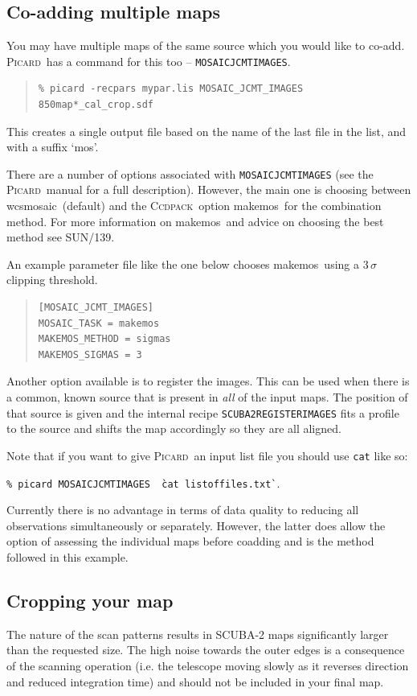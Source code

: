 \documentclass[twoside,11pt]{article}
\newcommand{\xref}[3]{#1}
\newcommand{\xlabel}[1]{}
\renewcommand{\_}{\texttt{\symbol{95}}}
\newenvironment{myquote}{\begin{quote}\begin{small}}{\end{small}\end{quote}}
\newcommand{\ccdpack}{\xref{\textsc{Ccdpack}}{sun139}{}}
\newcommand{\picard}{\xref{\textsc{Picard}}{sun265}{}}
\newcommand{\task}[1]{\textsf{#1}}
\newcommand{\param}[1]{\texttt{#1}}
\newcommand{\wcsmosaic}{\xref{\task{wcsmosaic}}{sun95}{WCSMOSAIC}}
\newcommand{\makemos}{\xref{\task{makemos}}{sun139}{MAKEMOS}}
\begin{document}
\subsection{\xlabel{coadd}Co-adding multiple maps}
\label{sec:coadd}
You may have multiple maps of the same source which you would like to co-add. \picard\ has a command for this too -- \param{MOSAIC\_JCMT\_IMAGES}. 
\begin{myquote}
\begin{verbatim}
% picard -recpars mypar.lis MOSAIC_JCMT_IMAGES 850map*_cal_crop.sdf
\end{verbatim}
\end{myquote}
This creates a single output file based on the name of the last file in the list, and with a suffix `\_mos'.

There are a number of options associated with \param{MOSAIC\_JCMT\_IMAGES} (see the \picard\ manual for a full description). However, the main one is choosing between \wcsmosaic\ (default) and the \ccdpack\ option \makemos\ for the combination method. For more information on \makemos\ and advice on choosing the best method see SUN/139.

An example parameter file like the one below chooses \makemos\ using a 3\,$\sigma$ clipping threshold.
\begin{myquote}
\begin{verbatim}
[MOSAIC_JCMT_IMAGES]
MOSAIC_TASK = makemos
MAKEMOS_METHOD = sigmas
MAKEMOS_SIGMAS = 3
\end{verbatim}
\end{myquote}
Another option available is to register the images. This can be used when there is a common, known source that is present in \emph{all} of the input maps. The position of that source is given and the internal recipe \param{SCUBA2\_REGISTER\_IMAGES} fits a profile to the source and shifts the map accordingly so they are all aligned. 

Note that if you want to give \picard\ an input list file you should use \texttt{cat} like so:

\texttt{\% picard MOSAIC\_JCMT\_IMAGES \`\,cat listoffiles.txt\`}.

Currently there is no advantage in terms of data quality to reducing all observations simultaneously or separately. However, the latter does allow the option of assessing the individual maps before coadding and is the method followed in this example.
\subsection{\xlabel{crop}Cropping your map}
\label{sec:crop}
The nature of the scan patterns results in SCUBA-2 maps significantly larger than the requested size. The high noise  towards the outer edges is a consequence of the scanning operation (i.e. the telescope moving slowly as it reverses direction and reduced integration time) and should not be included in your final map.
\end{document}
